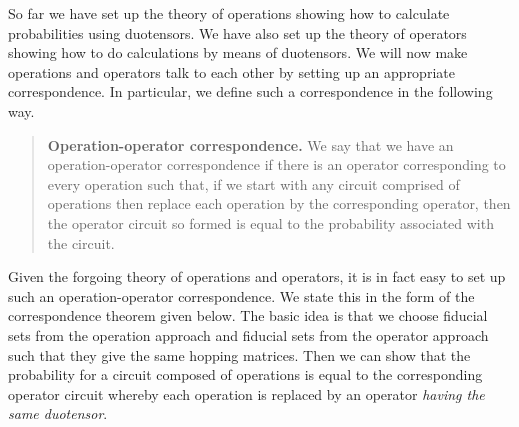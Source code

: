 \documentclass[10pt]{article}
\begin{document}
So far we have set up the theory of operations showing how to calculate probabilities using duotensors.  We have also set up the theory of operators showing how to do calculations by means of duotensors.  We will now make operations and operators talk to each other by setting up an appropriate correspondence. In particular, we define such a correspondence in the following way.
\begin{quote}
\textbf{Operation-operator correspondence.}  We say that we have an operation-operator correspondence if there is an operator corresponding to every operation such that, if we start with any circuit comprised of operations then replace each operation by the corresponding operator, then the operator circuit so formed is equal to the probability associated with the circuit.
\end{quote}
Given the forgoing theory of operations and operators, it is in fact easy to set up such an operation-operator correspondence.   We state this in the form of the correspondence theorem given below.  The basic idea is that we choose fiducial sets from the operation approach and fiducial sets from the operator approach such that they give the same hopping matrices.   Then we can show that the probability for a circuit composed of operations is equal to the corresponding operator circuit whereby each operation is replaced by an operator \emph{having the same duotensor}.
\end{document}
